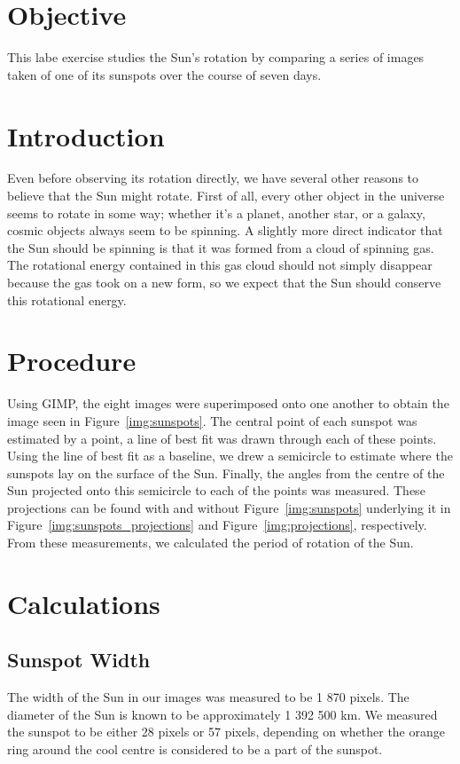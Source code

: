 \documentclass[11pt]{article}
\begin{document}
\section{Objective}
This labe exercise studies the Sun's rotation by comparing a series of images taken of one of its sunspots over the course of seven days.


\section{Introduction}
Even before observing its rotation directly, we have several other reasons to believe that the Sun might rotate.
First of all, every other object in the universe seems to rotate in some way; whether it's a planet, another star, or a galaxy, cosmic objects always seem to be spinning.
A slightly more direct indicator that the Sun should be spinning is that it was formed from a cloud of spinning gas.
The rotational energy contained in this gas cloud should not simply disappear because the gas took on a new form, so we expect that the Sun should conserve this rotational energy.


\section{Procedure}
Using GIMP, the eight images were superimposed onto one another to obtain the image seen in Figure~\ref{img:sunspots}.
The central point of each sunspot was estimated by a point, a line of best fit was drawn through each of these points.
Using the line of best fit as a baseline, we drew a semicircle to estimate where the sunspots lay on the surface of the Sun.
Finally, the angles from the centre of the Sun projected onto this semicircle to each of the points was measured.
These projections can be found with and without Figure~\ref{img:sunspots} underlying it in Figure~\ref{img:sunspots_projections} and Figure~\ref{img:projections}, respectively.
From these measurements, we calculated the period of rotation of the Sun.


\section{Calculations}
\subsection{Sunspot Width} \label{sec:sunspot_width}
The width of the Sun in our images was measured to be 1 870 pixels.
The diameter of the Sun is known to be approximately 1 392 500 km.
We measured the sunspot to be either 28 pixels or 57 pixels, depending on whether the orange ring around the cool centre is considered to be a part of the sunspot.
\end{document}
